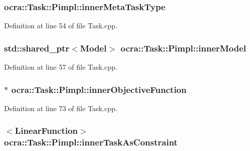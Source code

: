 \subsubsection[{\texorpdfstring{inner\+Meta\+Task\+Type}{innerMetaTaskType}}]{ ocra\+::\+Task\+::\+Pimpl\+::inner\+Meta\+Task\+Type}\hypertarget{structocra_1_1Task_1_1Pimpl_a74f9aa5427e6161018203a9e75da3bf4}{}\label{structocra_1_1Task_1_1Pimpl_a74f9aa5427e6161018203a9e75da3bf4}


Definition at line 54 of file Task.\+cpp.

\subsubsection[{\texorpdfstring{inner\+Model}{innerModel}}]{\setlength{\rightskip}{0pt plus 5cm}std\+::shared\+\_\+ptr$<${\bf Model}$>$ ocra\+::\+Task\+::\+Pimpl\+::inner\+Model}\hypertarget{structocra_1_1Task_1_1Pimpl_a6a98b6fb3efab282ba6d5092245b36d1}{}\label{structocra_1_1Task_1_1Pimpl_a6a98b6fb3efab282ba6d5092245b36d1}


Definition at line 57 of file Task.\+cpp.

\subsubsection[{\texorpdfstring{inner\+Objective\+Function}{innerObjectiveFunction}}]{$\ast$ ocra\+::\+Task\+::\+Pimpl\+::inner\+Objective\+Function}\hypertarget{structocra_1_1Task_1_1Pimpl_a1af1ebecf090dacfa6f25164857b2437}{}\label{structocra_1_1Task_1_1Pimpl_a1af1ebecf090dacfa6f25164857b2437}


Definition at line 73 of file Task.\+cpp.

\subsubsection[{\texorpdfstring{inner\+Task\+As\+Constraint}{innerTaskAsConstraint}}]{$<${\bf Linear\+Function}$>$ ocra\+::\+Task\+::\+Pimpl\+::inner\+Task\+As\+Constraint}\hypertarget{structocra_1_1Task_1_1Pimpl_ae4b95f72f96a2740186e49920e7672ad}{}\label{structocra_1_1Task_1_1Pimpl_ae4b95f72f96a2740186e49920e7672ad}


